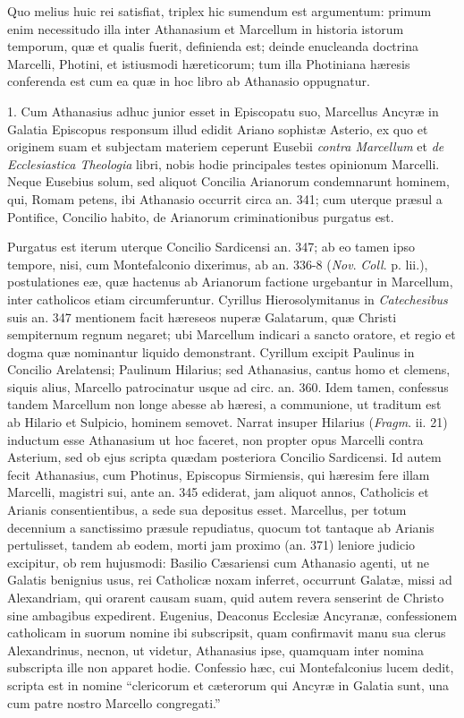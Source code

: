 
Quo melius huic rei satisfiat,
triplex hic sumendum est argumentum: primum enim necessitudo illa
inter Athanasium et Marcellum in historia istorum temporum, quæ
et qualis fuerit, definienda est; deinde enucleanda doctrina Marcelli,
Photini, et istiusmodi hæreticorum; tum illa Photiniana hæresis
conferenda est cum ea quæ in hoc libro ab Athanasio oppugnatur.

1.
Cum Athanasius adhuc junior esset in Episcopatu suo, Marcellus Ancyræ
in Galatia Episcopus responsum illud edidit Ariano sophistæ Asterio,
ex quo et originem suam et subjectam materiem ceperunt Eusebii \emph{contra
Marcellum} et \emph{de Ecclesiastica Theologia} libri, nobis hodie
principales testes opinionum Marcelli. Neque Eusebius solum, sed
aliquot Concilia Arianorum condemnarunt hominem, qui, Romam petens,
ibi Athanasio occurrit circa an. 341; cum uterque præsul a Pontifice,
Concilio habito, de Arianorum criminationibus purgatus est.

Purgatus
est iterum uterque Concilio Sardicensi an. 347; ab eo tamen ipso
tempore, nisi, cum Montefalconio dixerimus, ab an. 336-8 (\emph{Nov}. \emph{Coll}.
p. lii.), postulationes eæ, quæ hactenus ab Arianorum factione
urgebantur in Marcellum, inter catholicos etiam circumferuntur.
Cyrillus Hierosolymitanus in \emph{Catechesibus} suis an. 347
mentionem facit hæreseos nuperæ Galatarum, quæ Christi sempiternum
regnum negaret; ubi Marcellum indicari a sancto oratore, et regio et
dogma quæ nominantur liquido demonstrant. Cyrillum excipit Paulinus
in Concilio Arelatensi; Paulinum Hilarius; sed Athanasius, cantus homo
et clemens, siquis alius, Marcello patrocinatur usque ad circ. an.
360. Idem tamen, confessus tandem Marcellum non longe abesse ab hæresi,
a communione, ut traditum est ab Hilario et Sulpicio, hominem
semovet. Narrat insuper Hilarius (\emph{Fragm}. ii. 21) inductum esse
Athanasium ut hoc faceret, non propter opus Marcelli contra Asterium,
sed ob ejus scripta quædam posteriora Concilio Sardicensi. Id autem
fecit Athanasius, cum Photinus, Episcopus Sirmiensis, qui hæresim
fere illam Marcelli, magistri sui, ante an. 345 ediderat, jam aliquot
annos, Catholicis et Arianis consentientibus, a sede sua depositus
esset. Marcellus, per totum decennium a sanctissimo præsule
repudiatus, quocum tot tantaque ab Arianis pertulisset, tandem ab
eodem, morti jam proximo (an. 371) leniore judicio excipitur, ob rem
hujusmodi: Basilio Cæsariensi cum Athanasio agenti, ut ne Galatis
benignius usus, rei Catholicæ noxam inferret, occurrunt Galatæ,
missi ad Alexandriam, qui orarent causam suam, quid autem revera
senserint de Christo sine ambagibus expedirent. Eugenius, Deaconus
Ecclesiæ Ancyranæ, confessionem catholicam in suorum nomine ibi
subscripsit, quam confirmavit manu sua clerus Alexandrinus, necnon, ut
videtur, Athanasius ipse, quamquam inter nomina subscripta ille non
apparet hodie. Confessio hæc, cui Montefalconius lucem dedit, scripta
est in nomine ``clericorum et cæterorum qui Ancyræ in Galatia sunt,
una cum patre nostro Marcello congregati.''

